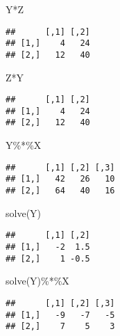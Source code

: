 \documentclass[
]{article}
\newenvironment{Shaded}{\begin{snugshade}}{\end{snugshade}}
\newcommand{\FunctionTok}[1]{\textcolor[rgb]{0.00,0.00,0.00}{#1}}
\newcommand{\NormalTok}[1]{#1}
\newcommand{\SpecialCharTok}[1]{\textcolor[rgb]{0.00,0.00,0.00}{#1}}
\begin{document}
\begin{Shaded}
\begin{Highlighting}[]
\NormalTok{Y}\SpecialCharTok{*}\NormalTok{Z}
\end{Highlighting}
\end{Shaded}

\begin{verbatim}
##      [,1] [,2]
## [1,]    4   24
## [2,]   12   40
\end{verbatim}

\begin{Shaded}
\begin{Highlighting}[]
\NormalTok{Z}\SpecialCharTok{*}\NormalTok{Y}
\end{Highlighting}
\end{Shaded}

\begin{verbatim}
##      [,1] [,2]
## [1,]    4   24
## [2,]   12   40
\end{verbatim}

\begin{Shaded}
\begin{Highlighting}[]
\NormalTok{Y}\SpecialCharTok{\%*\%}\NormalTok{X}
\end{Highlighting}
\end{Shaded}

\begin{verbatim}
##      [,1] [,2] [,3]
## [1,]   42   26   10
## [2,]   64   40   16
\end{verbatim}

\begin{Shaded}
\begin{Highlighting}[]
\FunctionTok{solve}\NormalTok{(Y)}
\end{Highlighting}
\end{Shaded}

\begin{verbatim}
##      [,1] [,2]
## [1,]   -2  1.5
## [2,]    1 -0.5
\end{verbatim}

\begin{Shaded}
\begin{Highlighting}[]
\FunctionTok{solve}\NormalTok{(Y)}\SpecialCharTok{\%*\%}\NormalTok{X}
\end{Highlighting}
\end{Shaded}

\begin{verbatim}
##      [,1] [,2] [,3]
## [1,]   -9   -7   -5
## [2,]    7    5    3
\end{verbatim}
\end{document}
